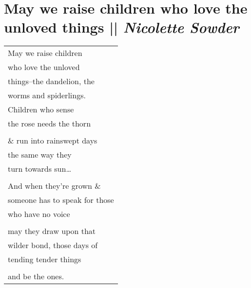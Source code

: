 \section[May we raise children who love the unloved things]{May we raise children who love the unloved things || \emph{Nicolette Sowder} \hspace*{\fill}  \thepage}
\hspace{0pt}
\vfill
\begin{center}
\begin{tabular}{l}
May we raise children\\
who love the unloved\\
things–the dandelion, the\\
worms and spiderlings.\\
Children who sense\\
the rose needs the thorn\\

\\\& run into rainswept days\\
the same way they\\
turn towards sun…\\

\\And when they’re grown \&\\
someone has to speak for those\\
who have no voice\\

\\may they draw upon that\\
wilder bond, those days of\\
tending tender things\\

\\and be the ones.
\end{tabular}
\end{center}
\vfill
\hspace{0pt}